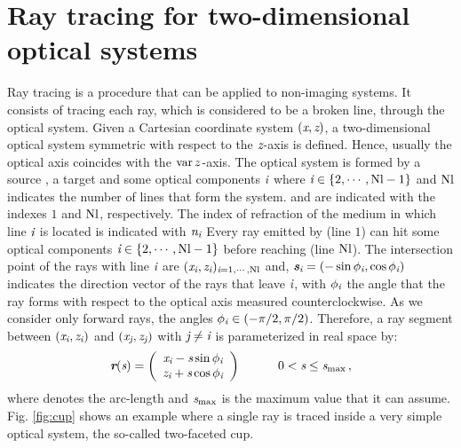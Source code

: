 \section{Ray tracing for two-dimensional optical systems}\label{sec:raytracing}
Ray tracing is a procedure that can be applied to non-imaging systems. It consists of tracing each ray, which is considered to be a broken line, through the optical system.
Given a Cartesian coordinate system $(\textit{x}, \textit{z})$, a two-dimensional optical system symmetric with respect to the $\textit{z}$-axis is defined. 
Hence, usually the optical axis coincides with the $\operatorname{var}{z}$-axis. 
The optical system is formed by a source , a target   and some optical components $\textit{i}$ where $\textit{i} \in \{2, \cdots, \textrm{Nl}-1\}$ and $\textrm{Nl}$
 indicates the number of lines that form the system.  and  are indicated with the indexes $1$ and $\textrm{Nl}$, respectively. 
The index of refraction of the medium in which line $\textit{i}$ is located is indicated with $\textit{n}_{\textit{i}}$
Every ray emitted by  (line $1$) can hit some optical components $\textit{i}\in\{2, \cdots, \textrm{Nl} -1\}$ before reaching  (line $\textrm{Nl}$). 
The intersection point of the rays with line $\textit{i}$ are $(\textit{x}_{\textit{i}}, \textit{z}_{\textit{i}})_{\textit{i} =1, \cdots, \textrm{Nl}}$ and, $\textit{\textbf{s}}_{\textit{i}}= (-\sin \phi_{\textit{i}}, \cos \phi_{\textit{i}})$ indicates the direction vector of the rays that leave $\textit{i}$,
with $\phi_{\textit{i}}$ the angle that the ray forms with respect to the optical axis measured counterclockwise. As we consider only forward rays, the angles 
$\phi_{\textit{i}}\in (-\pi/2, \pi/2)$.
Therefore, a ray segment between $(\textit{x}_{\textit{i}}, \textit{z}_{\textit{i}})$ and $(\textit{x}_{\textit{j}}, \textit{z}_{\textit{j}})$ 
with $\textit{j}\neq\textit{i}$ is parameterized in real space by:
\begin{equation}
\label{parametrization}
\textit{\textbf{r}}(\textit{s})=
\left( \begin{array}{cc}
\textit{x}_{\textit{i}}-\textit{s}\sin\phi_{\textit{i}} \\
\textit{z}_{\textit{i}}+\textit{s}\cos\phi_{\textit{i}}\end{array} \right) \qquad \quad 0< \textit{s}\leq \textit{s}_{\textrm{max}}\,,
\end{equation}
where  denotes the arc-length and $\textit{s}_{\textrm{max}}$ is the maximum value that it can assume. 
Fig. \ref{fig:cup} shows an example where a single ray is traced inside a very simple optical system, the so-called two-faceted cup. 

